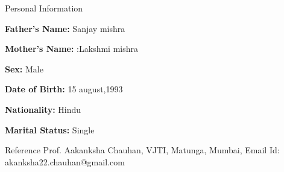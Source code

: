 \documentclass{resume} %
\begin{document}
\begin{rSection}{Personal Information}
	\item \textbf{Father’s Name:} Sanjay mishra
	\item \textbf{Mother’s Name: } :Lakshmi mishra
	\item \textbf{Sex:} Male
	\item \textbf{Date of Birth:} 15 august,1993 
	\item \textbf{Nationality: } Hindu
	\item \textbf{Marital Status:}	Single
\end{rSection}
\newpage
\begin{rSection}{Reference}
	Prof. Aakanksha Chauhan,
	\newline
	VJTI, Matunga, Mumbai,
	\newline
	Email Id: akanksha22.chauhan@gmail.com
	
\end{rSection}
\end{document}
